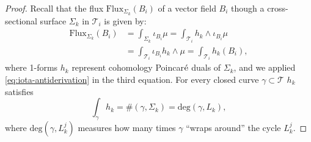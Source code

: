 \documentclass[12pt]{article}
\numberwithin{equation}{section}
\begin{document}
\begin{proof}
 Recall that the flux $\text{Flux}_{\Sigma_k}(B_i)$ of a vector field $B_i$ though a cross-sectional surface
 $\Sigma_k$ in $\mathcal{T}_i$ is given by:
 \begin{equation}\label{eq:flux}
 \begin{split}
  \text{Flux}_{\Sigma_k}(B_i) & =  \int_{\Sigma_k} \iota_{B_i}\mu=\int_{\mathcal{T}_i} h_k\wedge\iota_{B_i}\mu\\
  & =  \int_{\mathcal{T}_i} \iota_{B_i}h_k\wedge\mu =\int_{\mathcal{T}_i} h_k(B_i),
  \end{split}
 \end{equation}
 where 1-forms $h_k$ represent cohomology Poincar$\acute{\rm e}$ duals of $\Sigma_k$, and we applied \eqref{eq:iota-antiderivation} in the third equation. For every closed curve $\gamma\subset \mathcal{T}$   $h_k$ satisfies 
 \[
  \int_{\gamma} h_k=\#(\gamma,\Sigma_k)=\text{deg}(\gamma, L_k),
 \]
 where $\text{deg}(\gamma, L^j_k)$ measures how many times $\gamma$ ``wraps around'' the cycle  $L^j_k$. 
 

\end{proof}
\end{document}
